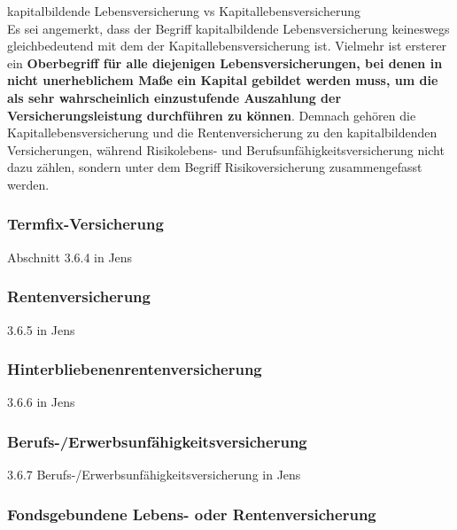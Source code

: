 \documentclass[
]{article}
\begin{document}
kapitalbildende Lebensversicherung vs Kapitallebensversicherung\\
Es sei angemerkt, dass der Begriff kapitalbildende Lebensversicherung
keineswegs gleichbedeutend mit dem der Kapitallebensversicherung ist.
Vielmehr ist ersterer ein \textbf{Oberbegriff für alle diejenigen
Lebensversicherungen, bei denen in nicht unerheblichem Maße ein Kapital
gebildet werden muss, um die als sehr wahrscheinlich einzustufende
Auszahlung der Versicherungsleistung durchführen zu können}. Demnach
gehören die Kapitallebensversicherung und die Rentenversicherung zu den
kapitalbildenden Versicherungen, während Risikolebens- und
Berufsunfähigkeitsversicherung nicht dazu zählen, sondern unter dem
Begriff Risikoversicherung zusammengefasst werden.

\hypertarget{termfix-versicherung}{%
\subsubsection{Termfix-Versicherung}\label{termfix-versicherung}}

Abschnitt 3.6.4 in Jens

\hypertarget{rentenversicherung}{%
\subsubsection{Rentenversicherung}\label{rentenversicherung}}

3.6.5 in Jens

\hypertarget{hinterbliebenenrentenversicherung}{%
\subsubsection{Hinterbliebenenrentenversicherung}\label{hinterbliebenenrentenversicherung}}

3.6.6 in Jens

\hypertarget{berufs-erwerbsunfuxe4higkeitsversicherung}{%
\subsubsection{Berufs-/Erwerbsunfähigkeitsversicherung}\label{berufs-erwerbsunfuxe4higkeitsversicherung}}

3.6.7 Berufs-/Erwerbsunfähigkeitsversicherung in Jens

\hypertarget{fondsgebundene-lebens--oder-rentenversicherung}{%
\subsubsection{Fondsgebundene Lebens- oder
Rentenversicherung}\label{fondsgebundene-lebens--oder-rentenversicherung}}
\end{document}

